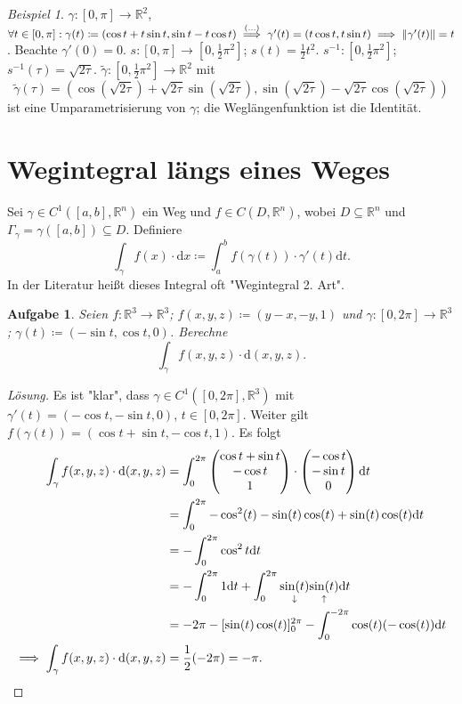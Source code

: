 \documentclass[a4paper]{article}
\newtheorem{aufgabe}{Aufgabe}
\theoremstyle{definition}
\theoremstyle{remark}
\newtheorem{beispiel}{Beispiel}
\renewcommand{\d}[1]{\mathrm{d}#1}
\begin{document}
		\begin{beispiel}
			$\gamma\colon[0, \pi]\to\mathbb{R}^2$, $\forall t\in[0, \pi]:\gamma(t)\coloneqq(\cos t + t \sin t, \sin t - t \cos t)
			\stackrel{(\ldots)}{\implies} \gamma'(t)=(t\cos t, t\sin t) \implies \norm{\gamma'(t)}=t$.
			Beachte $\gamma'(0)=0$. $s\colon [0, \pi]\to[0, \frac{1}{2}\pi^2]$; $s(t)=\frac{1}{2}t^2$.
			$s^{-1}\colon[0, \frac{1}{2}\pi^2]$; $s^{-1}(\tau)=\sqrt{2\tau}$.
			$\tilde{\gamma}\colon[0, \frac{1}{2}\pi^2]\to\mathbb{R}^2$ mit
			\[
				\tilde{\gamma}(\tau)=(\cos(\sqrt{2\tau})+\sqrt{2\tau}\sin(\sqrt{2\tau}),
				\sin(\sqrt{2\tau})-\sqrt{2\tau}\cos(\sqrt{2\tau}))
			\]
			ist eine Umparametrisierung von $\gamma$; die Weglängenfunktion ist die
			Identität.
		\end{beispiel}
	\section*{Wegintegral längs eines Weges}
		Sei $\gamma\in C^1([a, b], \mathbb{R}^n)$ ein Weg und $f\in C(D, \mathbb{R}^n)$,
		wobei $D\subseteq\mathbb{R}^n$ und $\Gamma_\gamma = \gamma([a, b])\subseteq D$. Definiere
		\[
			\int_\gamma f(x)\cdot \d{x}\coloneqq\int_a^bf(\gamma(t))\cdot\gamma'(t)\d{t}.
		\]
		In der Literatur heißt dieses Integral oft "Wegintegral 2. Art".

		\begin{aufgabe}
			Seien $f\colon\mathbb{R}^3\to\mathbb{R}^3$; $f(x, y, z)\coloneqq(y - x, -y, 1)$
			und $\gamma\colon[0, 2\pi]\to\mathbb{R}^3$; $\gamma(t)\coloneqq(-\sin t, \cos t, 0)$.
			Berechne
			\[
				\int_\gamma f(x, y, z)\cdot\d{(x, y, z)}.
			\]
		\end{aufgabe}
		\begin{proof}[Lösung]
			Es ist "klar", dass $\gamma\in C^1([0, 2\pi], \mathbb{R}^3)$ mit
			$\gamma'(t)=(-\cos t, -\sin t, 0)$, $t\in[0, 2\pi]$. Weiter gilt
			$f(\gamma(t)) = (\cos t + \sin t, -\cos t, 1)$. Es folgt
			\begin{align*}
				\int_\gamma f(x, y, z)\cdot\d{(x, y, z)} &= \int_0^{2\pi}
					\begin{pmatrix}\cos t + \sin t\\-\cos t\\1\end{pmatrix}\cdot
						\begin{pmatrix}-\cos t\\-\sin t\\0\end{pmatrix}\d{t}\\
						&= \int_0^{2\pi}-\cos^2(t)-\sin(t)\cos(t)+\sin(t)\cos(t)\d{t}\\
						&= -\int_0^{2\pi}\cos^2t\d{t}\\
						&= -\int_0^{2\pi}1\d{t} + \int_0^{2\pi}\underset{\downarrow}{\sin(t)}\underset{\uparrow}{\sin(t)}\d{t}\\
						&= -2\pi - [\sin(t)\cos(t)]^{2\pi}_0-\int_0^{-2\pi} \cos(t)(-\cos(t))\d{t}\\
						\implies\int_\gamma f(x, y, z)\cdot\d{(x, y, z)} &= \frac{1}{2}(-2\pi)=-\pi.\qedhere
			\end{align*}
		\end{proof}
\end{document}
